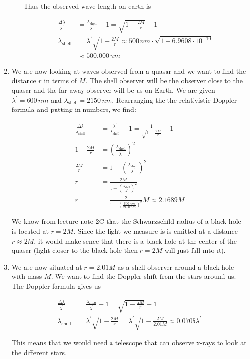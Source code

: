 \documentclass[a4paper,10pt,english]{article}
\begin{document}
\begin{enumerate}
\begin{enumerate}
Thus the observed wave length on earth is

\begin{align*}
\frac{\Delta \lambda}{\lambda^{\prime}}&=\frac{\lambda_{\text{shell}}}{\lambda^{\prime}}-1=\sqrt{1-\frac{2M}{r}}-1\\
\lambda_{\text{shell}}&=\lambda^{\prime}\sqrt{1-\frac{2M}{r}}\approx500\,nm\cdot\sqrt{1-6.9608\cdot10^{-10}}\\
&\approx500.000\,nm
\end{align*}
  
\end{enumerate}

\item We are now looking at waves observed from a quasar and we want to find the distance $r$ in terms of $M$. The shell observer will be the observer close to the quasar and the far-away observer will be us on Earth. We are given $\lambda^{\prime}=600\,nm$ and $\lambda_{\text{shell}}=2150\,nm$. Rearranging the the relativistic Doppler formula and putting in numbers, we find:

\begin{align*}
\frac{\Delta \lambda}{\lambda_{\text{shell}}}&=\frac{\lambda^{\prime}}{\lambda_{\text{shell}}}-1=\frac{1}{\sqrt{1-\frac{2M}{r}}}-1\\
1-\frac{2M}{r}&=\left(\frac{\lambda_{\text{shell}}}{\lambda^{\prime}}\right)^{2}\\
\frac{2M}{r}&=1-\left(\frac{\lambda_{\text{shell}}}{\lambda^{\prime}}\right)^{2}\\
r&=\frac{2M}{1-\left(\frac{\lambda_{\text{shell}}}{\lambda^{\prime}}\right)^{2}}\\
r&=\frac{2}{1-\left(\frac{600\,nm}{2150\,nm}\right)^{2}}M\approx2.1689M
\end{align*}

We know from lecture note 2C that the Schwarzschild radius of a black hole is located at $r=2M$. Since the light we measure is is emitted at a distance $r\approx2M$, it would make sence that there is a black hole at the center of the quasar (light closer to the black hole then $r=2M$ will just fall into it).

\item We are now situated at $r=2.01M$ as a shell observer around a black hole with mass $M$. We want to find the Doppler shift from the stars around us. The Doppler formula gives us

\begin{align*}
\frac{\Delta \lambda}{\lambda^{\prime}}&=\frac{\lambda_{\text{shell}}}{\lambda^{\prime}}-1=\sqrt{1-\frac{2M}{r}}-1\\
\lambda_{\text{shell}}&=\lambda^{\prime}\sqrt{1-\frac{2M}{r}}=\lambda^{\prime}\sqrt{1-\frac{2M}{2.01M}}\approx0.0705\lambda^{\prime}
\end{align*}

This means that we would need a telescope that can observe x-rays to look at the different stars.

\end{enumerate}
  
\end{document}
